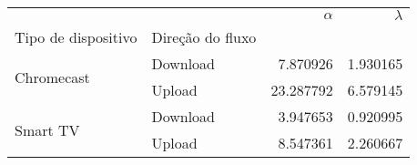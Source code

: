 \begin{tabular}{llrr}
\toprule
 &  & $\alpha$ & $\lambda$ \\
Tipo de dispositivo & Direção do fluxo &  &  \\
\midrule
\multirow[t]{2}{*}{Chromecast} & Download & 7.870926 & 1.930165 \\
 & Upload & 23.287792 & 6.579145 \\
\cline{1-4}
\multirow[t]{2}{*}{Smart TV} & Download & 3.947653 & 0.920995 \\
 & Upload & 8.547361 & 2.260667 \\
\cline{1-4}
\bottomrule
\end{tabular}
